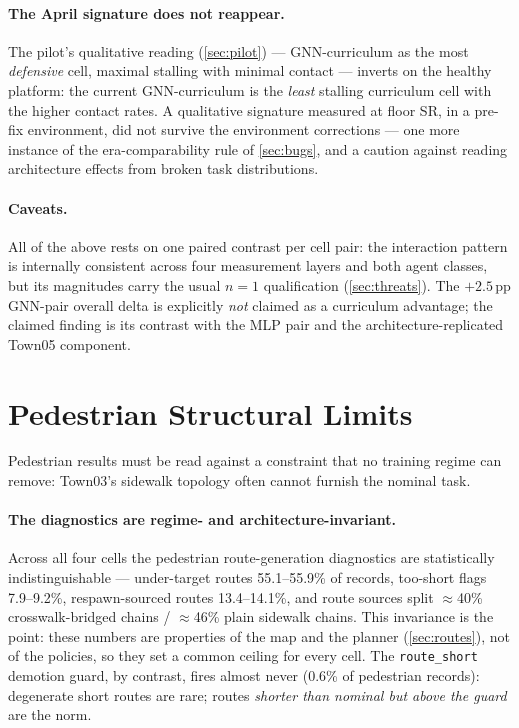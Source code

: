 \paragraph{The April signature does not reappear.}
The pilot's qualitative reading (\cref{sec:pilot}) --- GNN-curriculum as
the most \emph{defensive} cell, maximal stalling with minimal contact
--- inverts on the healthy platform: the current GNN-curriculum is the
\emph{least} stalling curriculum cell with the higher contact rates.
A qualitative signature measured at floor SR, in a pre-fix environment,
did not survive the environment corrections --- one more instance of the
era-comparability rule of \cref{sec:bugs}, and a caution against reading
architecture effects from broken task distributions.

\paragraph{Caveats.}
All of the above rests on one paired contrast per cell pair: the
interaction pattern is internally consistent across four measurement
layers and both agent classes, but its magnitudes carry the usual
$n{=}1$ qualification (\cref{sec:threats}). The $+2.5$\,pp GNN-pair
overall delta is explicitly \emph{not} claimed as a curriculum
advantage; the claimed finding is its contrast with the MLP pair and the
architecture-replicated Town05 component.

\section{Pedestrian Structural Limits}
\label{sec:ped-limits}

Pedestrian results must be read against a constraint that no training
regime can remove: Town03's sidewalk topology often cannot furnish the
nominal task.

\paragraph{The diagnostics are regime- and architecture-invariant.}
Across all four cells the pedestrian route-generation diagnostics are
statistically indistinguishable --- under-target routes 55.1--55.9\% of
records, too-short flags 7.9--9.2\%, respawn-sourced routes 13.4--14.1\%,
and route sources split $\approx$40\% crosswalk-bridged chains /
$\approx$46\% plain sidewalk chains. This invariance is the point: these
numbers are properties of the map and the planner
(\cref{sec:routes}), not of the policies, so they set a common ceiling
for every cell. The \texttt{route\_short} demotion guard, by contrast,
fires almost never (0.6\% of pedestrian records): degenerate short routes
are rare; routes \emph{shorter than nominal but above the guard} are the
norm.


